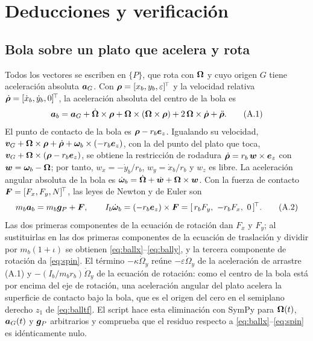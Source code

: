 \section{Deducciones y verificación}
\label{app:derivations}

\subsection{Bola sobre un plato que acelera y rota}
Todos los vectores se escriben en $\{P\}$, que rota con $\bm{\Omega}$ y cuyo origen $G$ tiene aceleración absoluta $\bm{a}_G$. Con $\bm{\rho}=[x_b,y_b,\varepsilon]^{\!\top}$ y la velocidad relativa $\dot{\bm{\rho}}=[\dot x_b,\dot y_b,0]^{\!\top}$, la aceleración absoluta del centro de la bola es
\begin{equation}
  \bm{a}_b=\bm{a}_G+\dot{\bm{\Omega}}\times\bm{\rho}+\bm{\Omega}\times(\bm{\Omega}\times\bm{\rho})+2\,\bm{\Omega}\times\dot{\bm{\rho}}+\ddot{\bm{\rho}}.
  \tag{A.1}
\end{equation}
El punto de contacto de la bola es $\bm{\rho}-r_b\bm{e}_z$. Igualando su velocidad, $\bm{v}_G+\bm{\Omega}\times\bm{\rho}+\dot{\bm{\rho}}+\bm{\omega}_b\times(-r_b\bm{e}_z)$, con la del punto del plato que toca, $\bm{v}_G+\bm{\Omega}\times(\bm{\rho}-r_b\bm{e}_z)$, se obtiene la restricción de rodadura $\dot{\bm{\rho}}=r_b\,\bm{w}\times\bm{e}_z$ con $\bm{w}=\bm{\omega}_b-\bm{\Omega}$; por tanto, $w_x=-\dot y_b/r_b$, $w_y=\dot x_b/r_b$ y $w_z$ es libre. La aceleración angular absoluta de la bola es $\dot{\bm{\omega}}_b=\dot{\bm{\Omega}}+\dot{\bm{w}}+\bm{\Omega}\times\bm{w}$. Con la fuerza de contacto $\bm{F}=[F_x,F_y,N]^{\!\top}$, las leyes de Newton y de Euler son
\begin{equation}
  m_b\bm{a}_b=m_b\bm{g}_P+\bm{F},\qquad I_b\dot{\bm{\omega}}_b=(-r_b\bm{e}_z)\times\bm{F}=[\,r_bF_y,\ -r_bF_x,\ 0\,]^{\!\top} .
  \tag{A.2}
\end{equation}
Las dos primeras componentes de la ecuación de rotación dan $F_x$ y $F_y$; al sustituirlas en las dos primeras componentes de la ecuación de traslación y dividir por $m_b(1+\iota)$ se obtienen \eqref{eq:ballx}--\eqref{eq:bally}, y la tercera componente de rotación da \eqref{eq:spin}. El término $-\kappa\dot\Omega_y$ reúne $-\varepsilon\dot\Omega_y$ de la aceleración de arrastre (A.1) y $-(I_b/m_br_b)\dot\Omega_y$ de la ecuación de rotación: como el centro de la bola está por encima del eje de rotación, una aceleración angular del plato acelera la superficie de contacto bajo la bola, que es el origen del cero en el semiplano derecho $z_1$ de \eqref{eq:balltf}. El script  hace esta eliminación con SymPy para $\bm{\Omega}(t)$, $\bm{a}_G(t)$ y $\bm{g}_P$ arbitrarios y comprueba que el residuo respecto a \eqref{eq:ballx}--\eqref{eq:spin} es idénticamente nulo.

